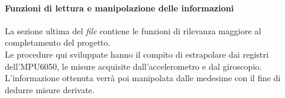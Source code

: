 \documentclass[11pt]{report}
\begin{document}
\paragraph{Funzioni di lettura e manipolazione delle informazioni}
La sezione ultima del \textit{file} contiene le funzioni di rilevanza maggiore al completamento del progetto.\\
Le procedure qui sviluppate hanno il compito di estrapolare dai registri dell'MPU6050, le misure acquisite dall'accelerometro e dal giroscopio. L'informazione ottenuta verrà poi manipolata dalle medesime con il fine di dedurre misure derivate.
\end{document}

